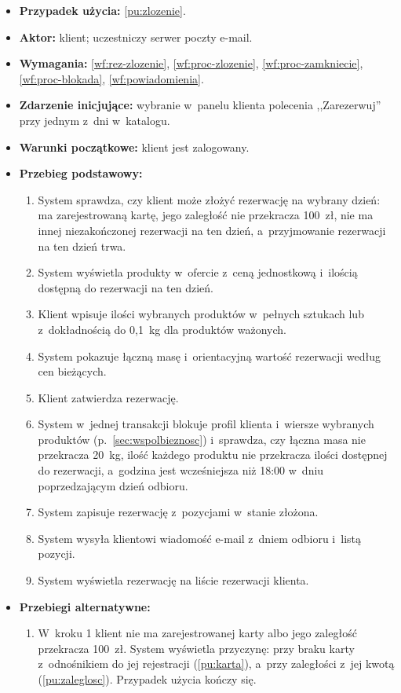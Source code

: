 \documentclass[12pt,a4paper,oneside]{article}
\newcounter{pu}
\begin{document}
\begin{itemize}
	\item \textbf{Przypadek użycia:} \ref{pu:zlozenie}.
	\item \textbf{Aktor:} klient; uczestniczy serwer poczty e-mail.
	\item \textbf{Wymagania:} \ref{wf:rez-zlozenie}, \ref{wf:proc-zlozenie}, \ref{wf:proc-zamkniecie}, \ref{wf:proc-blokada}, \ref{wf:powiadomienia}.
	\item \textbf{Zdarzenie inicjujące:} wybranie w~panelu klienta polecenia ,,Zarezerwuj'' przy jednym z~dni w~katalogu.
	\item \textbf{Warunki początkowe:} klient jest zalogowany.
	\item \textbf{Przebieg podstawowy:}
	\begin{enumerate}
		\item System sprawdza, czy klient może złożyć rezerwację na wybrany dzień: ma zarejestrowaną kartę, jego zaległość nie przekracza 100~zł, nie ma innej niezakończonej rezerwacji na ten dzień, a~przyjmowanie rezerwacji na ten dzień trwa.
		\item System wyświetla produkty w~ofercie z~ceną jednostkową i~ilością dostępną do rezerwacji na ten dzień.
		\item Klient wpisuje ilości wybranych produktów w~pełnych sztukach lub z~dokładnością do 0,1~kg dla produktów ważonych.
		\item System pokazuje łączną masę i~orientacyjną wartość rezerwacji według cen bieżących.
		\item Klient zatwierdza rezerwację.
		\item System w~jednej transakcji blokuje profil klienta i~wiersze wybranych produktów (p.~\ref{sec:wspolbieznosc}) i~sprawdza, czy łączna masa nie przekracza 20~kg, ilość każdego produktu nie przekracza ilości dostępnej do rezerwacji, a~godzina jest wcześniejsza niż 18:00 w~dniu poprzedzającym dzień odbioru.
		\item System zapisuje rezerwację z~pozycjami w~stanie złożona.
		\item System wysyła klientowi wiadomość e-mail z~dniem odbioru i~listą pozycji.
		\item System wyświetla rezerwację na liście rezerwacji klienta.
	\end{enumerate}
	\item \textbf{Przebiegi alternatywne:}
	\begin{enumerate}[label=A\arabic*.]
		\item W~kroku 1 klient nie ma zarejestrowanej karty albo jego zaległość przekracza 100~zł. System wyświetla przyczynę: przy braku karty z~odnośnikiem do jej rejestracji (\ref{pu:karta}), a~przy zaległości z~jej kwotą (\ref{pu:zaleglosc}). Przypadek użycia kończy się.

\end{enumerate}
\end{itemize}
\end{document}
